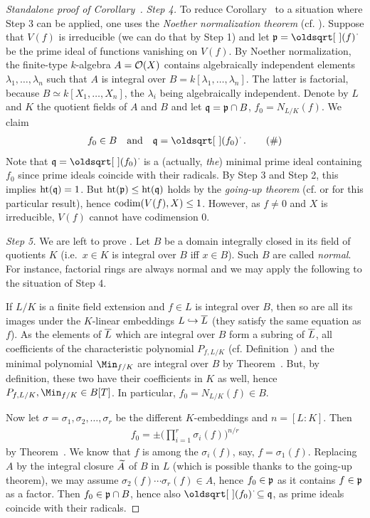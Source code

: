 \documentclass[a4paper,parskip=half,numbers=enddot, DIV=12]{scrreprt}
\begin{document}
\begin{proof}[Standalone proof of Corollary~]
	\emph{Step 4.} To reduce Corollary~ to a situation where Step 3 can be applied, one uses the \emph{Noether normalization theorem} (cf. \cite[Theorem~3]{alg1}). Suppose that $V(f)$ is irreducible (we can do that by Step 1) and let $\pp=\sqrt{(f)}$ be the prime ideal of functions vanishing on $V(f)$. By Noether normalization, the finite-type $k$-algebra $A=\mathcal{O}(X)$ contains algebraically independent elements $\lambda_1,\ldots,\lambda_n$ such that $A$ is integral over $B=k[\lambda_1,\ldots,\lambda_n]$. The latter is factorial, because $B\simeq k[X_1,\ldots,X_n]$, the $\lambda_i$ being algebraically independent. Denote by $L$ and $K$ the quotient fields of $A$ and $B$ and let $\mathfrak{q}=\mathfrak{p}\cap B$, $f_0=N_{L/K}(f)$. We claim
	\begin{align}\lbl{eq:GoingUp2Bapplied}
		f_0\in B\quad\text{and}\quad \qq=\sqrt{(f_0)}\;.\tag{\#}
	\end{align}
	Note that $\qq=\sqrt{(f_0)}$ is a (actually, \emph{the}) minimal prime ideal containing $f_0$ since prime ideals coincide with their radicals. By Step 3 and Step 2, this implies $\operatorname{ht}(\mathfrak{q})=1$. But $\operatorname{ht}(\mathfrak{p})\leq\operatorname{ht}(\mathfrak{q})$ holds by the \emph{going-up theorem} (cf. \cite[Theorem~7]{alg1} or \cite[Fact~2.6.2]{alg1} for this particular result), hence $\operatorname{codim}(V(f), X)\leq 1$. However, as $f\not=0$ and $X$ is irreducible, $V(f)$ cannot have codimension 0. 
	
	\emph{Step 5.} We are left to prove . Let $B$ be a domain integrally closed in its field of quotients $K$ (i.e.\ $x\in K$ is integral over $B$ iff $x\in B$). Such $B$ are called \emph{normal}. For instance, factorial rings are always normal and we may apply the following to the situation of Step 4. 
	
	If $L/K$ is a finite field extension and $f\in L$ is integral over $B$, then so are all its images under the $K$-linear embeddings $L\hookrightarrow \overline L$ (they satisfy the same equation as $f$). As the elements of $\overline L$ which are integral over $B$ form a subring of $\overline L$, all coefficients of the characteristic polynomial $P_{f,L/K}$ (cf. Definition~) and the minimal polynomial $\Min_{f/K}$ are integral over $B$ by Theorem~. But, by definition, these two have their coefficients in $K$ as well, hence $P_{f,L/K},\Min_{f/K}\in B[T]$. In particular, $f_0=N_{L/K}(f)\in B$.
	
	Now let $\sigma=\sigma_1,\sigma_2,\ldots,\sigma_r$ be the different $K$-embeddings and $n=[L:K]$. Then 
	\begin{align*}
		f_0=\pm \bigg(\prod_{i=1}^{r}\sigma_i(f)\bigg)^{n/r}
	\end{align*}
	by Theorem~. We know that $f$ is among the $\sigma_i(f)$, say, $f=\sigma_1(f)$. Replacing $A$ by the integral closure $\snake A$ of $B$ in $L$ (which is possible thanks to the going-up theorem), we may assume $\sigma_2(f)\cdots\sigma_r(f)\in A$, hence $f_0\in \mathfrak{p}$ as it contains $f\in\mathfrak{p}$ as a factor. Then $f_0\in\mathfrak{p}\cap B$, hence also $\sqrt{(f_0)}\subseteq\qq$, as prime ideals coincide with their radicals. 
	

\end{proof}
\end{document}
